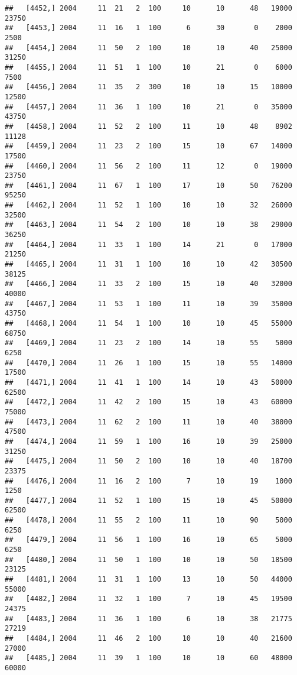 \documentclass{article}\usepackage[]{graphicx}\usepackage[]{color}
\makeatletter
\newenvironment{kframe}{%
 \def\at@end@of@kframe{}%
 \ifinner\ifhmode%
  \def\at@end@of@kframe{\end{minipage}}%
  \begin{minipage}{\columnwidth}%
 \fi\fi%
 \def\FrameCommand##1{\hskip\@totalleftmargin \hskip-\fboxsep
 \colorbox{shadecolor}{##1}\hskip-\fboxsep
     \hskip-\linewidth \hskip-\@totalleftmargin \hskip\columnwidth}%
 \MakeFramed {\advance\hsize-\width
   \@totalleftmargin\z@ \linewidth\hsize
   \@setminipage}}%
 {\par\unskip\endMakeFramed%
 \at@end@of@kframe}
\newenvironment{knitrout}{}{} %
\makeatother
\begin{document}
\begin{knitrout}
\begin{kframe}
\begin{verbatim}
##   [4452,] 2004     11  21   2  100     10      10      48   19000   23750
##   [4453,] 2004     11  16   1  100      6      30       0    2000    2500
##   [4454,] 2004     11  50   2  100     10      10      40   25000   31250
##   [4455,] 2004     11  51   1  100     10      21       0    6000    7500
##   [4456,] 2004     11  35   2  300     10      10      15   10000   12500
##   [4457,] 2004     11  36   1  100     10      21       0   35000   43750
##   [4458,] 2004     11  52   2  100     11      10      48    8902   11128
##   [4459,] 2004     11  23   2  100     15      10      67   14000   17500
##   [4460,] 2004     11  56   2  100     11      12       0   19000   23750
##   [4461,] 2004     11  67   1  100     17      10      50   76200   95250
##   [4462,] 2004     11  52   1  100     10      10      32   26000   32500
##   [4463,] 2004     11  54   2  100     10      10      38   29000   36250
##   [4464,] 2004     11  33   1  100     14      21       0   17000   21250
##   [4465,] 2004     11  31   1  100     10      10      42   30500   38125
##   [4466,] 2004     11  33   2  100     15      10      40   32000   40000
##   [4467,] 2004     11  53   1  100     11      10      39   35000   43750
##   [4468,] 2004     11  54   1  100     10      10      45   55000   68750
##   [4469,] 2004     11  23   2  100     14      10      55    5000    6250
##   [4470,] 2004     11  26   1  100     15      10      55   14000   17500
##   [4471,] 2004     11  41   1  100     14      10      43   50000   62500
##   [4472,] 2004     11  42   2  100     15      10      43   60000   75000
##   [4473,] 2004     11  62   2  100     11      10      40   38000   47500
##   [4474,] 2004     11  59   1  100     16      10      39   25000   31250
##   [4475,] 2004     11  50   2  100     10      10      40   18700   23375
##   [4476,] 2004     11  16   2  100      7      10      19    1000    1250
##   [4477,] 2004     11  52   1  100     15      10      45   50000   62500
##   [4478,] 2004     11  55   2  100     11      10      90    5000    6250
##   [4479,] 2004     11  56   1  100     16      10      65    5000    6250
##   [4480,] 2004     11  50   1  100     10      10      50   18500   23125
##   [4481,] 2004     11  31   1  100     13      10      50   44000   55000
##   [4482,] 2004     11  32   1  100      7      10      45   19500   24375
##   [4483,] 2004     11  36   1  100      6      10      38   21775   27219
##   [4484,] 2004     11  46   2  100     10      10      40   21600   27000
##   [4485,] 2004     11  39   1  100     10      10      60   48000   60000

\end{verbatim}
\end{kframe}
\end{knitrout}
\end{document}
